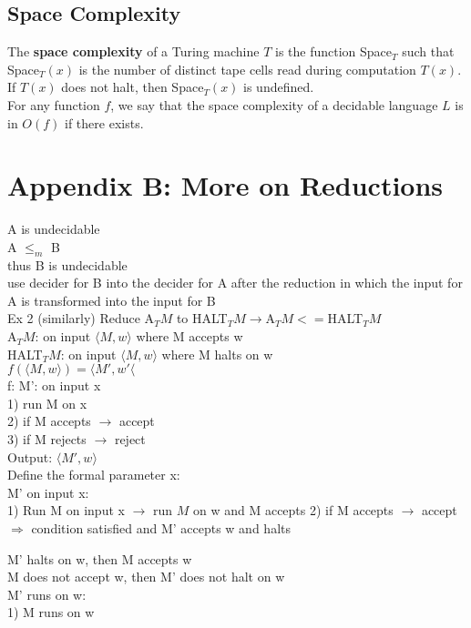 \documentclass{article}
\begin{document}
\subsection{Space Complexity}
The \textbf{space complexity} of a Turing machine $T$ is the function Space$_T$ such that Space$_T(x)$ is the number of distinct tape cells read during computation $T(x)$. If $T(x)$ does not halt, then Space$_T(x)$ is undefined. \\
For any function $f$, we say that the space complexity of a decidable language $L$ is in $O(f)$ if there exists.


\newpage

\section{Appendix B: More on Reductions}
A is undecidable \\
A $\leq_m$ B \\
thus B is undecidable\\
use decider for B into the decider for A after the reduction in which the input for A is transformed into the input for B \\
Ex 2 (similarly)
Reduce A$_TM$ to HALT$_TM \rightarrow $A$_TM <= $HALT$_TM$ \\
A$_TM$: on input $\langle M,w\rangle$ where M accepts w \\
HALT$_TM$: on input $\langle M,w\rangle$ where M halts on w \\

$f(\langle M,w\rangle) = \langle M',w'\langle$ \\
f: M': on input x \\ 
1) run M on x \\
2) if M accepts $\rightarrow$ accept \\
3) if M rejects $\rightarrow$ reject \\
Output: $\langle M',w\rangle$ \\

Define the formal parameter x: \\
M' on input x: \\
1) Run M on input x $\rightarrow$ run $M$ on w and M accepts
2) if M accepts $\rightarrow$ accept $\Rightarrow$ condition satisfied and M' accepts w and halts



M' halts on w, then M accepts w \\
M does not accept w, then M' does not halt on w \\

M' runs on w:\\
1) M runs on w \\
\end{document}
